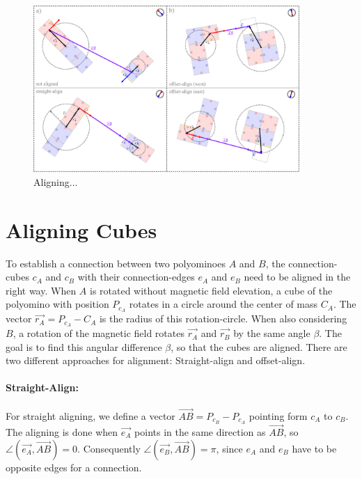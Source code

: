 \begin{figure}
	\centering
	\includegraphics[width=0.90\textwidth]{figures/aligning.pdf}
	\caption{Aligning...}
	\label{fig:aligning}
\end{figure}

\section{Aligning Cubes}
\label{sec:align}

To establish a connection between two polyominoes $A$ and $B$, the connection-cubes $c_A$ and $c_B$ with their connection-edges $e_A$ and $e_B$ need to be aligned in the right way.
When $A$ is rotated without magnetic field elevation, a cube of the polyomino with position $P_{c_A}$ rotates in a circle around the center of mass $C_A$.
The vector $\vec{r_A} = P_{c_A} - C_A$ is the radius of this rotation-circle.
When also considering $B$, a rotation of the magnetic field rotates $\vec{r_A}$ and $\vec{r_B}$ by the same angle $\beta$.
The goal is to find this angular difference $\beta$, so that the cubes are aligned.
There are two different approaches for alignment: Straight-align and offset-align.

\paragraph{Straight-Align:}

For straight aligning, we define a vector $\overrightarrow{AB} = P_{c_B} - P_{c_A}$ pointing form $c_A$ to $c_B$.
The aligning is done when $\vec{e_A}$ points in the same direction as $\overrightarrow{AB}$, so $\angle \left( \vec{e_A}, \overrightarrow{AB} \right) = 0$.
Consequently $\angle \left( \vec{e_B}, \overrightarrow{AB} \right) = \pi$, since $e_A$ and $e_B$ have to be opposite edges for a connection.

